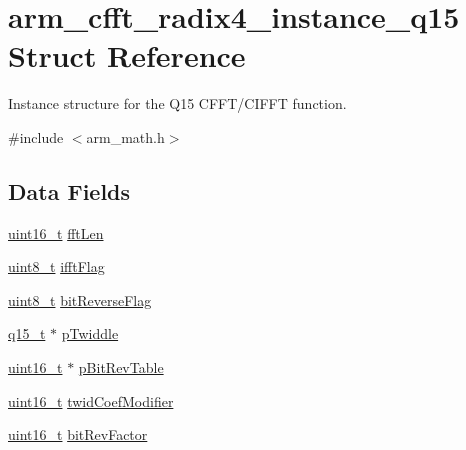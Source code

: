 \hypertarget{structarm__cfft__radix4__instance__q15}{\section{arm\-\_\-cfft\-\_\-radix4\-\_\-instance\-\_\-q15 Struct Reference}
\label{structarm__cfft__radix4__instance__q15}
}


Instance structure for the Q15 C\-F\-F\-T/\-C\-I\-F\-F\-T function.  




{\ttfamily \#include $<$arm\-\_\-math.\-h$>$}

\subsection*{Data Fields}
\begin{DoxyCompactItemize}
\item 
\hyperlink{stdint_8h_a273cf69d639a59973b6019625df33e30}{uint16\-\_\-t} \hyperlink{structarm__cfft__radix4__instance__q15_a5fc543e7d84ca8cb7cf6648970f21ca6}{fft\-Len}
\item 
\hyperlink{stdint_8h_aba7bc1797add20fe3efdf37ced1182c5}{uint8\-\_\-t} \hyperlink{structarm__cfft__radix4__instance__q15_a2ecff6ea735cb4d22e922d0fd5736655}{ifft\-Flag}
\item 
\hyperlink{stdint_8h_aba7bc1797add20fe3efdf37ced1182c5}{uint8\-\_\-t} \hyperlink{structarm__cfft__radix4__instance__q15_a101e3f7b0bd6b5b14cd5214f23df4133}{bit\-Reverse\-Flag}
\item 
\hyperlink{arm__math_8h_ab5a8fb21a5b3b983d5f54f31614052ea}{q15\-\_\-t} $\ast$ \hyperlink{structarm__cfft__radix4__instance__q15_a29dd693537e45421a36891f8439e1fba}{p\-Twiddle}
\item 
\hyperlink{stdint_8h_a273cf69d639a59973b6019625df33e30}{uint16\-\_\-t} $\ast$ \hyperlink{structarm__cfft__radix4__instance__q15_a4acf704ae0cf30b53bf0fbfae8e34a59}{p\-Bit\-Rev\-Table}
\item 
\hyperlink{stdint_8h_a273cf69d639a59973b6019625df33e30}{uint16\-\_\-t} \hyperlink{structarm__cfft__radix4__instance__q15_af32fdc78bcc27ca385f9b76a0a1f71c3}{twid\-Coef\-Modifier}
\item 
\hyperlink{stdint_8h_a273cf69d639a59973b6019625df33e30}{uint16\-\_\-t} \hyperlink{structarm__cfft__radix4__instance__q15_a6b010e5f02d1130c621e3d2e26b95df1}{bit\-Rev\-Factor}
\end{DoxyCompactItemize}


